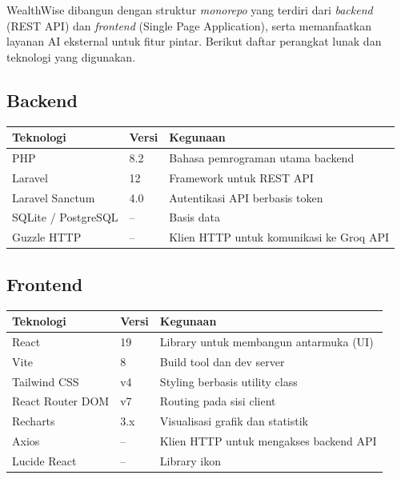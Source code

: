 \documentclass[11pt]{article}
\begin{document}
WealthWise dibangun dengan struktur \textit{monorepo} yang terdiri dari \textit{backend} (REST API) dan \textit{frontend} (Single Page Application), serta memanfaatkan layanan AI eksternal untuk fitur pintar. Berikut daftar perangkat lunak dan teknologi yang digunakan.

\subsection{Backend}
\begin{table}[h]
\centering
\begin{tabular}{@{}p{4cm}p{1.5cm}p{8cm}@{}}
\toprule
\textbf{Teknologi} & \textbf{Versi} & \textbf{Kegunaan} \\
\midrule
PHP & 8.2 & Bahasa pemrograman utama backend \\
Laravel & 12 & Framework untuk REST API \\
Laravel Sanctum & 4.0 & Autentikasi API berbasis token \\
SQLite / PostgreSQL & -- & Basis data \\
Guzzle HTTP & -- & Klien HTTP untuk komunikasi ke Groq API \\
\bottomrule
\end{tabular}
\end{table}

\subsection{Frontend}
\begin{table}[h]
\centering
\begin{tabular}{@{}p{4cm}p{1.5cm}p{8cm}@{}}
\toprule
\textbf{Teknologi} & \textbf{Versi} & \textbf{Kegunaan} \\
\midrule
React & 19 & Library untuk membangun antarmuka (UI) \\
Vite & 8 & Build tool dan dev server \\
Tailwind CSS & v4 & Styling berbasis utility class \\
React Router DOM & v7 & Routing pada sisi client \\
Recharts & 3.x & Visualisasi grafik dan statistik \\
Axios & -- & Klien HTTP untuk mengakses backend API \\
Lucide React & -- & Library ikon \\
\bottomrule
\end{tabular}
\end{table}
\end{document}
